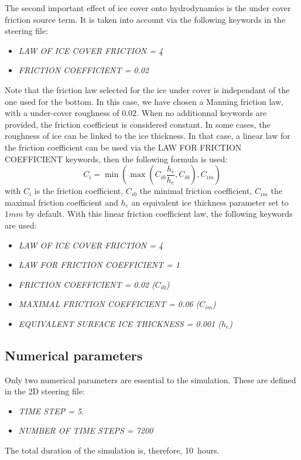 The second important effect of ice cover onto hydrodynamics is the under cover friction source term.
It is taken into account via the following keywords in the \khione steering file:
\begin{itemize}
    \item\textit{LAW OF ICE COVER FRICTION = 4}
    \item\textit{FRICTION COEFFICIENT = 0.02}
\end{itemize}
Note that the friction law selected for the ice under cover is independant of the one used for the bottom.
In this case, we have chosen a Manning friction law, with a under-cover roughness of $0.02$.
When no additionnal keywords are provided, the friction coefficient is considered constant.
In some cases, the roughness of ice can be linked to the ice thickness. 
In that case, a linear law for the friction coefficient can be used via the LAW FOR FRICTION COEFFICIENT keywords, then the following formula is used:
\begin{equation}
C_i = \min \left( \max \left( C_{i0} \dfrac{h_i}{h_{e}}, C_{i0} \right), C_{im} \right)
\end{equation}
with $C_i$ is the friction coefficient, $C_{i0}$ the minimal friction coefficient,
$C_{im}$ the maximal friction coefficient and $h_{e}$ an equivalent ice thickness parameter set to $1mm$ by default. With this linear friction coefficient law, the following keywords are used:
\begin{itemize}
    \item\textit{LAW OF ICE COVER FRICTION = 4}
    \item\textit{LAW FOR FRICTION COEFFICIENT = 1}
    \item\textit{FRICTION COEFFICIENT = 0.02 ($C_{i0}$)}
    \item\textit{MAXIMAL FRICTION COEFFICIENT = 0.06 ($C_{im}$)}
    \item\textit{EQUIVALENT SURFACE ICE THICKNESS = 0.001 ($h_{e}$)}
\end{itemize}

\subsection{Numerical parameters}
Only two numerical parameters are essential to the simulation. These are defined in the \telemac2D steering file:
\begin{itemize}
    \item\textit{TIME STEP = 5.}
    \item\textit{NUMBER OF TIME STEPS = 7200}
\end{itemize}
The total duration of the simulation is, therefore, 10~hours.

